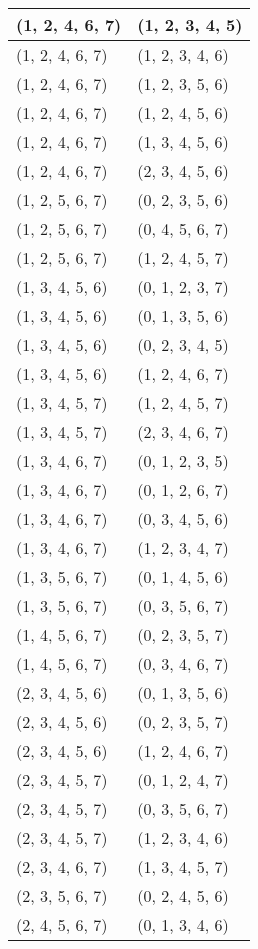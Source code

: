 \begin{footnotesize}
\begin{longtable}[c]{|l|l|}
(1, 2, 4, 6, 7)
&(1, 2, 3, 4, 5)
\\ \hline
(1, 2, 4, 6, 7)
&(1, 2, 3, 4, 6)
\\ \hline
(1, 2, 4, 6, 7)
&(1, 2, 3, 5, 6)
\\ \hline
(1, 2, 4, 6, 7)
&(1, 2, 4, 5, 6)
\\ \hline
(1, 2, 4, 6, 7)
&(1, 3, 4, 5, 6)
\\ \hline
(1, 2, 4, 6, 7)
&(2, 3, 4, 5, 6)
\\ \hline
(1, 2, 5, 6, 7)
&(0, 2, 3, 5, 6)
\\ \hline
(1, 2, 5, 6, 7)
&(0, 4, 5, 6, 7)
\\ \hline
(1, 2, 5, 6, 7)
&(1, 2, 4, 5, 7)
\\ \hline
(1, 3, 4, 5, 6)
&(0, 1, 2, 3, 7)
\\ \hline
(1, 3, 4, 5, 6)
&(0, 1, 3, 5, 6)
\\ \hline
(1, 3, 4, 5, 6)
&(0, 2, 3, 4, 5)
\\ \hline
(1, 3, 4, 5, 6)
&(1, 2, 4, 6, 7)
\\ \hline
(1, 3, 4, 5, 7)
&(1, 2, 4, 5, 7)
\\ \hline
(1, 3, 4, 5, 7)
&(2, 3, 4, 6, 7)
\\ \hline
(1, 3, 4, 6, 7)
&(0, 1, 2, 3, 5)
\\ \hline
(1, 3, 4, 6, 7)
&(0, 1, 2, 6, 7)
\\ \hline
(1, 3, 4, 6, 7)
&(0, 3, 4, 5, 6)
\\ \hline
(1, 3, 4, 6, 7)
&(1, 2, 3, 4, 7)
\\ \hline
(1, 3, 5, 6, 7)
&(0, 1, 4, 5, 6)
\\ \hline
(1, 3, 5, 6, 7)
&(0, 3, 5, 6, 7)
\\ \hline
(1, 4, 5, 6, 7)
&(0, 2, 3, 5, 7)
\\ \hline
(1, 4, 5, 6, 7)
&(0, 3, 4, 6, 7)
\\ \hline
(2, 3, 4, 5, 6)
&(0, 1, 3, 5, 6)
\\ \hline
(2, 3, 4, 5, 6)
&(0, 2, 3, 5, 7)
\\ \hline
(2, 3, 4, 5, 6)
&(1, 2, 4, 6, 7)
\\ \hline
(2, 3, 4, 5, 7)
&(0, 1, 2, 4, 7)
\\ \hline
(2, 3, 4, 5, 7)
&(0, 3, 5, 6, 7)
\\ \hline
(2, 3, 4, 5, 7)
&(1, 2, 3, 4, 6)
\\ \hline
(2, 3, 4, 6, 7)
&(1, 3, 4, 5, 7)
\\ \hline
(2, 3, 5, 6, 7)
&(0, 2, 4, 5, 6)
\\ \hline
(2, 4, 5, 6, 7)
&(0, 1, 3, 4, 6)

\end{longtable}
\end{footnotesize}
